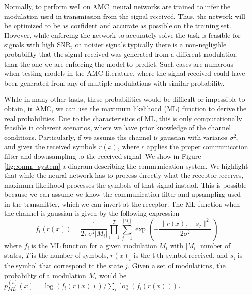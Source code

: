 \documentclass[conference]{IEEEtran}
\begin{document}



Normally, to perform well on AMC, neural networks are trained to infer the modulation used in transmission from the signal received. Thus, the network will be optimized to be as confident and accurate as possible on the training set. However, while enforcing the network to accurately solve the task is feasible for signals with high SNR, on noisier signals typically there is a non-negligible probability that the signal received was generated from a different modulation than the one we are enforcing the model to predict. Such cases are numerous when testing models in the AMC literature, where the signal received could have been generated from any of multiple modulations with similar probability.

While in many other tasks, these probabilities would be difficult or impossible to obtain, in AMC, we can use the maximum likelihood (ML) function to derive the real probabilities. Due to the characteristics of ML, this is only computationally feasible in coherent scenarios, where we have prior knowledge of the channel conditions. Particularly, if we assume the channel is gaussian with variance $\sigma^{2}$, and given the received symbols $r(x)$, where $r$ applies the proper communication filter and downsampling to the received signal. We show in Figure \ref{fig:comm_system} a diagram describing the communication system. We highlight that while the neural network has to process directly what the receptor receives, maximum likelihood processes the symbols of that signal instead. This is possible because we can assume we know the communication filter and upsampling used in the transmitter, which we can invert at the receptor. The ML function when the channel is gaussian is given by the following expression
\begin{equation}
	f_{i}(r(x)) = \dfrac{1}{2\pi \sigma^{2}|M_i|}\prod_{t=1}^{T} \sum_{j=1}^{|M_i|} \exp\left(-\dfrac{\lVert r(x)_t - s_j\rVert^{2}}{2 \sigma^{2}}\right)
\label{eq:ml}
\end{equation}
where $f_{i}$ is the ML function for a given modulation $M_i$ with $|M_i|$ number of states, $T$ is the number of symbols, $r(x)_t$ is the t-th symbol received, and $s_j$ is the symbol that correspond to the state $j$. Given a set of modulations, the probability of a modulation $M_i$ would be $p_{ML}^{(i)}(x) = \log(f_{i}(r(x))) / \sum_i \log(f_{i}(r(x)))$.
\end{document}
